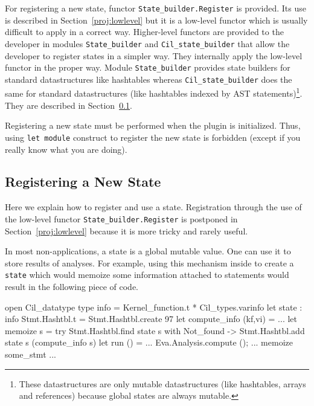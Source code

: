 For registering a new state, functor
\texttt{State\_builder.Register} is
provided. Its use is described in Section~\ref{proj:lowlevel} but it is a
low-level functor which is usually difficult to apply in a correct
way. Higher-level functors are provided to the developer in modules
\texttt{State\_builder} and
\texttt{Cil\_state\_builder} that allow the
developer to register states in a simpler way. They internally apply the
low-level functor in the proper way. Module \texttt{State\_builder} provides
state builders for standard \caml datastructures like
hashtables whereas \texttt{Cil\_state\_builder} does the same
for standard \cil datastructures (like hashtables indexed by AST
statements)\footnote{These datastructures are only mutable datastructures (like
  hashtables, arrays and references) because global states are always
  mutable.}. They are described in Section~\ref{proj:computation}.

\begin{important}
  Registering a new state must be performed when the plugin is
  initialized. Thus, using \caml \texttt{let module} construct to
  register the new state is forbidden (except if you really know what
  you are doing).
\end{important}

\subsection{Registering a New State}\label{proj:computation}

Here we explain how to register and use a state. Registration through the use of
the low-level functor \texttt{State\_builder.Register} is postponed in
Section~\ref{proj:lowlevel} because it is more tricky and rarely useful.

In most non-\framac applications, a state is a global mutable value. One can use
it to store results of analyses. For example, using this mechanism inside
\framac to create a \texttt{state} which would memoize some
information attached to statements would result in the following piece of code.
\begin{ocamlcode}
open Cil_datatype
type info = Kernel_function.t * Cil_types.varinfo
let state : info Stmt.Hashtbl.t = Stmt.Hashtbl.create 97
let compute_info (kf,vi) = ...
let memoize s =
  try Stmt.Hashtbl.find state s
  with Not_found -> Stmt.Hashtbl.add state s (compute_info s)
let run () = ... Eva.Analysis.compute (); ... memoize some_stmt ...
\end{ocamlcode}

